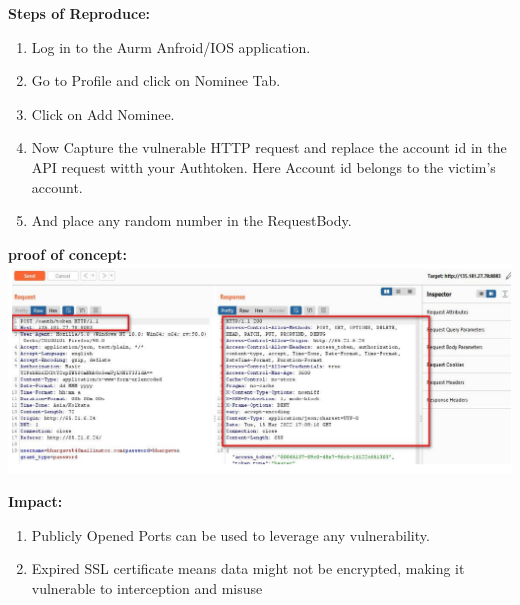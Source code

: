 \documentclass{article}
\begin{document}
\begin{description}[itemsep=2pt, leftmargin=0.2cm]
                    \item \large \textbf{Steps of Reproduce:}
                            \linespread{1.0}
                            \begin{enumerate}[leftmargin=0.5cm]
                             
                             \item \large Log in to the Aurm Anfroid/IOS application.

                             \item \large Go to Profile and click on Nominee Tab.

                             \item \large Click on Add Nominee.

                             \item \large Now Capture the vulnerable HTTP request and replace the account id in the API request witth your Authtoken. Here Account id belongs to the victim's account.

                             \item \large And place any random number in the RequestBody.
                             \end{enumerate}

                    \item \large \textbf{proof of concept: \\ \includegraphics[width=1.0\textwidth]{2.png} } 

                    \item \large \textbf{Impact:}
                            \linespread{1.0}
                            \begin{enumerate}[leftmargin=0.5cm]
                             \item \large Publicly Opened Ports can be used to leverage any vulnerability.
\item \large Expired SSL certificate means data might not be encrypted, making it vulnerable to interception and misuse 
                            \end{enumerate}  
                            

\end{description}
\end{document}
